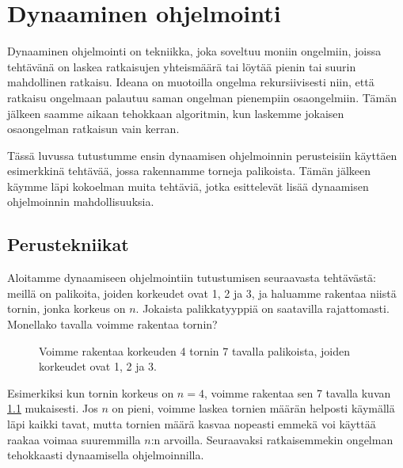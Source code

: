 \chapter{Dynaaminen ohjelmointi}

Dynaaminen ohjelmointi on tekniikka,
joka soveltuu moniin ongelmiin,
joissa tehtävänä on laskea ratkaisujen yhteismäärä
tai löytää pienin tai suurin mahdollinen ratkaisu.
Ideana on muotoilla ongelma rekursiivisesti niin,
että ratkaisu ongelmaan palautuu saman ongelman
pienempiin osaongelmiin.
Tämän jälkeen saamme aikaan tehokkaan algoritmin,
kun laskemme jokaisen osaongelman ratkaisun vain kerran.

Tässä luvussa tutustumme ensin dynaamisen ohjelmoinnin perusteisiin
käyttäen esimerkkinä tehtävää, jossa rakennamme torneja palikoista.
Tämän jälkeen käymme läpi kokoelman muita tehtäviä, jotka esittelevät
lisää dynaamisen ohjelmoinnin mahdollisuuksia.

\section{Perustekniikat}

Aloitamme dynaamiseen ohjelmointiin tutustumisen
seuraavasta tehtävästä:
meillä on palikoita, joiden korkeudet ovat 1, 2 ja 3,
ja haluamme rakentaa niistä tornin, jonka korkeus on $n$.
Jokaista palikkatyyppiä on saatavilla rajattomasti.
Monellako tavalla voimme rakentaa tornin?

\begin{figure}
\center
{}
\caption{Voimme rakentaa korkeuden 4 tornin 7 tavalla palikoista,
joiden korkeudet ovat 1, 2 ja 3.}
\label{fig:dyntor}
\end{figure}

Esimerkiksi kun tornin korkeus on $n=4$, voimme rakentaa
sen 7 tavalla kuvan \ref{fig:dyntor} mukaisesti.
Jos $n$ on pieni, voimme laskea tornien määrän helposti
käymällä läpi kaikki tavat, mutta tornien määrä kasvaa
nopeasti emmekä voi käyttää raakaa voimaa suuremmilla
$n$:n arvoilla.
Seuraavaksi ratkaisemmekin ongelman tehokkaasti
dynaamisella ohjelmoinnilla.

